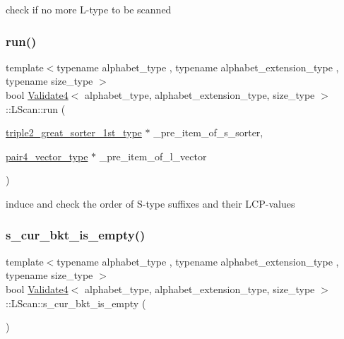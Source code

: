 check if no more L-\/type to be scanned 

\mbox{\label{struct_validate4_1_1_l_scan_ac923c1ac593c291db774594e8f51c9e5}} 
\subsubsection{\texorpdfstring{run()}{run()}}
{\footnotesize\ttfamily template$<$typename alphabet\+\_\+type , typename alphabet\+\_\+extension\+\_\+type , typename size\+\_\+type $>$ \\
bool \hyperlink{class_validate4}{Validate4}$<$ alphabet\+\_\+type, alphabet\+\_\+extension\+\_\+type, size\+\_\+type $>$\+::L\+Scan\+::run (\begin{DoxyParamCaption}\item[{\hyperlink{class_validate4_aa35a0ebf404821377118043d536be262}{triple2\+\_\+great\+\_\+sorter\+\_\+1st\+\_\+type} $\ast$}]{\+\_\+pre\+\_\+item\+\_\+of\+\_\+s\+\_\+sorter,  }\item[{\hyperlink{class_validate4_a883822e6f1be0d67f71e1feb9729b1dc}{pair4\+\_\+vector\+\_\+type} $\ast$}]{\+\_\+pre\+\_\+item\+\_\+of\+\_\+l\+\_\+vector }\end{DoxyParamCaption})\hspace{0.3cm}{\ttfamily [inline]}}



induce and check the order of S-\/type suffixes and their L\+C\+P-\/values 

\mbox{\label{struct_validate4_1_1_l_scan_a9331f92d91cf67c38a3d6948a2190df8}} 
\subsubsection{\texorpdfstring{s\+\_\+cur\+\_\+bkt\+\_\+is\+\_\+empty()}{s\_cur\_bkt\_is\_empty()}}
{\footnotesize\ttfamily template$<$typename alphabet\+\_\+type , typename alphabet\+\_\+extension\+\_\+type , typename size\+\_\+type $>$ \\
bool \hyperlink{class_validate4}{Validate4}$<$ alphabet\+\_\+type, alphabet\+\_\+extension\+\_\+type, size\+\_\+type $>$\+::L\+Scan\+::s\+\_\+cur\+\_\+bkt\+\_\+is\+\_\+empty (\begin{DoxyParamCaption}{ }\end{DoxyParamCaption})\hspace{0.3cm}{\ttfamily [inline]}}



